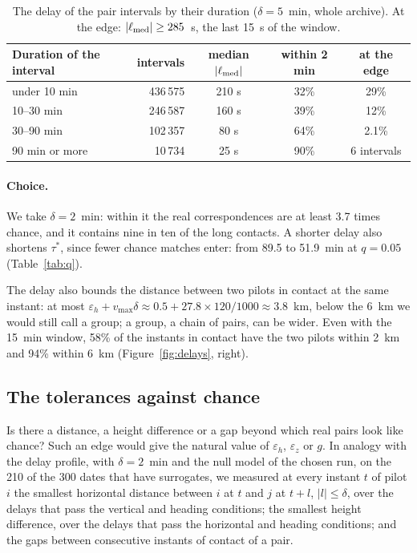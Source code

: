 \begin{table}
\centering
\small
\begin{tabular}{@{}l r c c c@{}}
\toprule
Duration of the interval & intervals & median $|\ell_{\rm med}|$ & within 2 min & at the edge \\
\midrule
under 10 min & 436\,575 & 210 s & 32\% & 29\% \\
10--30 min & 246\,587 & 160 s & 39\% & 12\% \\
30--90 min & 102\,357 & 80 s & 64\% & 2.1\% \\
90 min or more & 10\,734 & 25 s & 90\% & 6 intervals \\
\bottomrule
\end{tabular}
\caption{The delay of the pair intervals by their duration ($\delta=5$~min, whole archive). At
the edge: $|\ell_{\rm med}|\ge285$~s, the last 15~s of the window.}
\label{tab:ell}
\end{table}

\paragraph{Choice.} We take $\delta=2$~min: within it the real correspondences are at least 3.7
times chance, and it contains nine in ten of the long contacts. A shorter delay also shortens
$\tau^*$, since fewer chance matches enter: from 89.5 to 51.9~min at $q=0.05$ (Table~\ref{tab:q}).

The delay also bounds the distance between two pilots in contact at the same instant: at most
$\varepsilon_h+v_{\max}\delta\approx0.5+27.8\times120/1000\approx3.8$~km, below the 6~km we would
still call a group; a group, a chain of pairs, can be wider. Even with the 15~min window, 58\% of
the instants in contact have the two pilots within 2~km and 94\% within 6~km
(Figure~\ref{fig:delays}, right).

\subsection{The tolerances against chance}\label{sec:tolerances}

Is there a distance, a height difference or a gap beyond which real pairs look like chance? Such
an edge would give the natural value of $\varepsilon_h$, $\varepsilon_z$ or $g$. In analogy with
the delay profile, with $\delta=2$~min and the null model of the chosen run, on the 210 of the 300
dates that have surrogates, we measured at every instant $t$ of pilot $i$ the smallest horizontal
distance between $i$ at $t$ and $j$ at $t+l$, $|l|\le\delta$, over the delays that pass the
vertical and heading conditions; the smallest height difference, over the delays that pass the
horizontal and heading conditions; and the gaps between consecutive instants of contact of a
pair.

